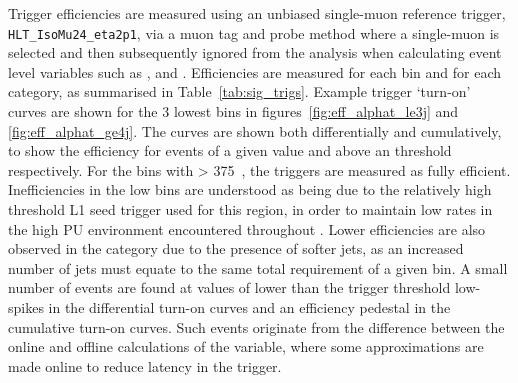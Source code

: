 Trigger efficiencies are measured using an unbiased single-muon reference
trigger,
\\\verb!HLT_IsoMu24_eta2p1!, via a muon tag and probe method where a
single-muon is selected and then subsequently ignored from the analysis when 
calculating event level variables such as \HT, \mht and \alphat. Efficiencies 
are measured for each \HT bin and for each \nj category, as summarised in 
Table~\ref{tab:sig_trigs}. Example trigger `turn-on' curves are shown for the 3 
lowest \HT bins in figures~\ref{fig:eff_alphat_le3j} and \ref{fig:eff_alphat_ge4j}.
The curves are shown both differentially and cumulatively, to show the
efficiency for events of a given \alphat value and above an \alphat threshold
respectively.
For the bins with \HT > 375~\gev, the triggers are measured as fully efficient.
Inefficiencies in the low \HT bins are
understood as being due to the relatively high threshold L1 seed trigger used
for this region, in order to maintain
low rates in the high PU environment encountered throughout \runone. Lower 
efficiencies are also observed in the \njhigh category due to the presence of 
softer jets, as an increased number of jets must equate to the same total \HT 
requirement of a given bin. A small number of events are found at values of
\alphat lower than the trigger threshold low-\alphat spikes in the differential
turn-on curves and an efficiency pedestal in the cumulative turn-on curves. Such
events originate from the difference between the online and offline calculations
of the \alphat variable, where some approximations are made online to reduce
latency in the trigger.


